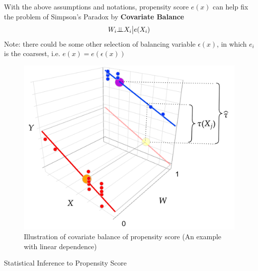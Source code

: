     
With the above assumptions and notations, propensity score $ e(x) $ can help fix the problem of Simpson's Paradox by \textbf{Covariate Balance}
\begin{align}
    W_i\bot\!\!\!\bot X_i\big| e(X_i) 
\end{align}
Note: there could be some other selection of balancing variable $ \epsilon(x) $, in which $ e_i $ is the coarsest, i.e. $ e(x)= e(\epsilon(x))  $
\begin{figure}[H]
    \centering
    \includegraphics[width=0.55\linewidth]{sections/images/propensity.png}
    \caption{Illustration of covariate balance of propensity score (An example with linear dependence)}
\end{figure}

\begin{point}
    Statistical Inference to Propensity Score
\end{point}

